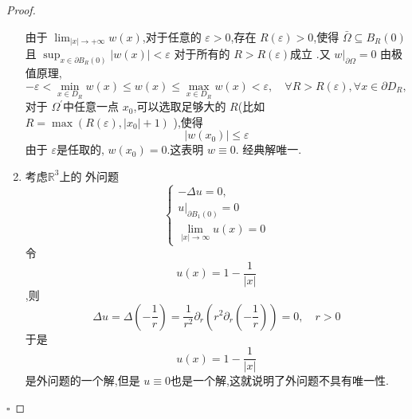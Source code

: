 \documentclass[../../main.tex]{subfiles}
\begin{document}
\begin{problemsec}
\begin{proof}
\begin{enumerate}
        由于 \(  \lim_{\left| x \right|\to + \infty }w\left( x \right)   \),对于任意的 \(   \varepsilon > 0  \),存在 \(  R\left(  \varepsilon  \right)> 0   \),使得 \(   \bar{\Omega}\subseteq B_{R }\left( 0 \right)   \)且 \(  \sup _{x\in  \partial B_{R }\left( 0 \right) }\left| w\left( x \right)  \right|<  \varepsilon    \) 对于所有的 \(  R> R\left(  \varepsilon  \right)   \)成立     .又 \(  w|_{ \partial  \Omega }= 0  \) 由极值原理, \[
        - \varepsilon < \min _{x\in D_{R}}w\left( x\right)\le w\left( x \right)\le  \max _{x\in D_{R }}w\left( x \right)<  \varepsilon   , \quad\forall R> R\left(  \varepsilon  \right), \forall x\in  \partial D_{R},
        \]对于 \(   \Omega ^{\prime}   \)中任意一点 \(  x_0  \),可以选取足够大的 \(  R  \)(比如 \(  R = \max \left( R\left(  \varepsilon  \right),\left| x_0 \right|+ 1   \right)   \) ),使得 \[
        \left| w\left( x_0 \right)  \right|\le  \varepsilon  
        \]  由于 \(   \varepsilon   \)是任取的,   \(  w\left( x_0 \right)= 0   \).这表明 \(  w\equiv 0  \). 经典解唯一.   
        \item 考虑\(  \mathbb{R} ^{3}  \)上的 外问题 \[
        \begin{cases} - \Delta u= 0,\\ 
         u|_{ \partial B_{1}\left( 0 \right) }= 0 \\ 
          \lim_{\left| x \right|\to \infty }u\left( x \right)= 0 \end{cases} 
        \]令 \[
        u\left( x \right)= 1-\frac{1 }{\left| x \right|  }  
        \],则 \[
         \Delta u=   \Delta \left( -\frac{1 }{r }  \right)= \frac{1 }{r^{2} } \partial _{r}\left( r^{2} \partial _{r}\left( -\frac{1 }{r }  \right)  \right)=    0,\quad r> 0
        \]于是 \[
        u\left( x \right)= 1-\frac{1 }{\left| x \right|  }  
        \]是外问题的一个解,但是 \(  u \equiv 0  \)也是一个解,这就说明了外问题不具有唯一性. 
    \end{enumerate}
    \hfill $\square$
\end{proof}


\end{problemsec}
\end{document}
